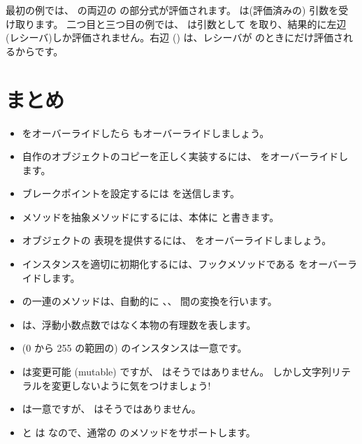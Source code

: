 \documentclass[a4paper,10pt,twoside]{book}
\begin{document}
最初の例では、 の両辺の  の部分式が評価されます。\ct{&} は(評価済みの)  引数を受け取ります。
二つ目と三つ目の例では、 は引数として  を取り、結果的に左辺(レシーバ)しか評価されません。右辺 () は、レシーバが  のときにだけ評価されるからです。


\section{まとめ}

\begin{itemize}

  \item \ct{=} をオーバーライドしたら  もオーバーライドしましょう。

  \item 自作のオブジェクトのコピーを正しく実装するには、 をオーバーライドします。

  \item ブレークポイントを設定するには  を送信します。

  \item メソッドを抽象メソッドにするには、本体に  と書きます。

  \item オブジェクトの  表現を提供するには、 をオーバーライドしましょう。

  \item インスタンスを適切に初期化するには、フックメソッドである  をオーバーライドします。

  \item {} の一連のメソッドは、自動的に 、、 間の変換を行います。

  \item {} は、浮動小数点数ではなく本物の有理数を表します。

  \item (0 から 255 の範囲の)  のインスタンスは一意です。

  \item {} は変更可能 (mutable) ですが、 はそうではありません。
  しかし文字列リテラルを変更しないように気をつけましょう!

  \item {} は一意ですが、 はそうではありません。

  \item {} と  は  なので、通常の  のメソッドをサポートします。

\end{itemize}

\ifx\wholebook\relax\else
   
   
\end{document}
